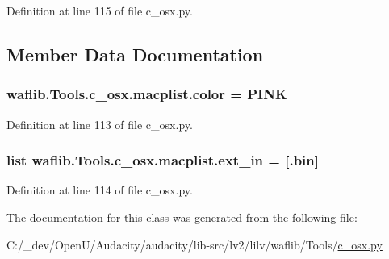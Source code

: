 Definition at line 115 of file c\+\_\+osx.\+py.



\subsection{Member Data Documentation}
\subsubsection[{\texorpdfstring{color}{color}}]{ waflib.\+Tools.\+c\+\_\+osx.\+macplist.\+color = \textquotesingle{}P\+I\+NK\textquotesingle{}\hspace{0.3cm}{\ttfamily [static]}}\hypertarget{classwaflib_1_1_tools_1_1c__osx_1_1macplist_a56f29cd2365c9688ca3b966c059f0db9}{}\label{classwaflib_1_1_tools_1_1c__osx_1_1macplist_a56f29cd2365c9688ca3b966c059f0db9}


Definition at line 113 of file c\+\_\+osx.\+py.

\subsubsection[{\texorpdfstring{ext\+\_\+in}{ext_in}}]{\setlength{\rightskip}{0pt plus 5cm}list waflib.\+Tools.\+c\+\_\+osx.\+macplist.\+ext\+\_\+in = \mbox{[}\textquotesingle{}.bin\textquotesingle{}\mbox{]}\hspace{0.3cm}{\ttfamily [static]}}\hypertarget{classwaflib_1_1_tools_1_1c__osx_1_1macplist_aa19f03165422cb1be3148c378125cc81}{}\label{classwaflib_1_1_tools_1_1c__osx_1_1macplist_aa19f03165422cb1be3148c378125cc81}


Definition at line 114 of file c\+\_\+osx.\+py.



The documentation for this class was generated from the following file\+:\begin{DoxyCompactItemize}
\item 
C\+:/\+\_\+dev/\+Open\+U/\+Audacity/audacity/lib-\/src/lv2/lilv/waflib/\+Tools/\hyperlink{lilv_2waflib_2_tools_2c__osx_8py}{c\+\_\+osx.\+py}\end{DoxyCompactItemize}
